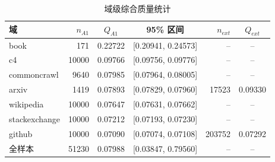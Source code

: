 \begin{table}[H]
  \centering
  \caption{域级综合质量统计}
  \label{tab:q1_domain_Q}
  \small
  \begin{tabular}{lrccrc}
    \toprule
    域 & $n_{A1}$ & $Q_{A1}$ & 95\% 区间 & $n_{ext}$ & $Q_{ext}$ \\
    \midrule
    book & 171 & 0.22722 & [0.20941, 0.24573] & -- & -- \\
    c4 & 10000 & 0.09766 & [0.09756, 0.09776] & -- & -- \\
    commoncrawl & 9640 & 0.07985 & [0.07964, 0.08005] & -- & -- \\
    arxiv & 1419 & 0.07893 & [0.07829, 0.07960] & 17523 & 0.09330 \\
    wikipedia & 10000 & 0.07647 & [0.07631, 0.07662] & -- & -- \\
    stackexchange & 10000 & 0.07212 & [0.07193, 0.07230] & -- & -- \\
    github & 10000 & 0.07090 & [0.07074, 0.07108] & 203752 & 0.07292 \\
    \midrule
    全样本 & 51230 & 0.07988 & [0.03847, 0.79560] & -- & -- \\
    \bottomrule
  \end{tabular}
\end{table}
